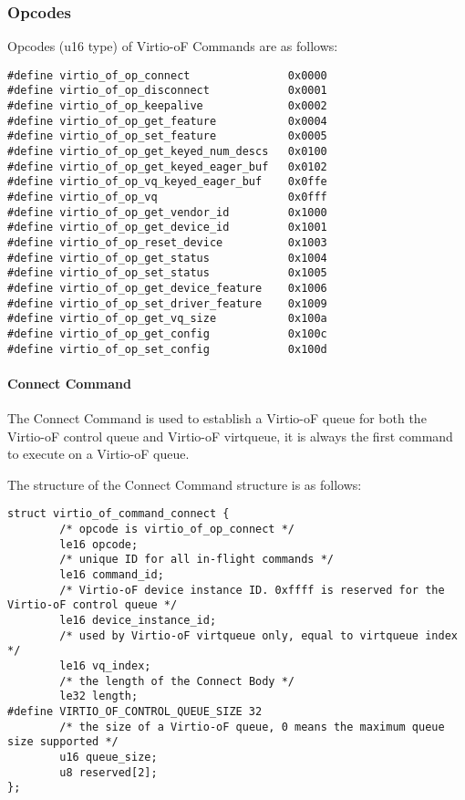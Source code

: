 \subsubsection{Opcodes}\label{sec:Virtio Transport Options / Virtio Over Fabrics / Commands Definition / Opcodes}
Opcodes (u16 type) of Virtio-oF Commands are as follows:

\begin{lstlisting}
#define virtio_of_op_connect               0x0000
#define virtio_of_op_disconnect            0x0001
#define virtio_of_op_keepalive             0x0002
#define virtio_of_op_get_feature           0x0004
#define virtio_of_op_set_feature           0x0005
#define virtio_of_op_get_keyed_num_descs   0x0100
#define virtio_of_op_get_keyed_eager_buf   0x0102
#define virtio_of_op_vq_keyed_eager_buf    0x0ffe
#define virtio_of_op_vq                    0x0fff
#define virtio_of_op_get_vendor_id         0x1000
#define virtio_of_op_get_device_id         0x1001
#define virtio_of_op_reset_device          0x1003
#define virtio_of_op_get_status            0x1004
#define virtio_of_op_set_status            0x1005
#define virtio_of_op_get_device_feature    0x1006
#define virtio_of_op_set_driver_feature    0x1009
#define virtio_of_op_get_vq_size           0x100a
#define virtio_of_op_get_config            0x100c
#define virtio_of_op_set_config            0x100d
\end{lstlisting}

\paragraph{Connect Command}\label{sec:Virtio Transport Options / Virtio Over Fabrics / Commands Definition / Opcodes / Connect Command}

The Connect Command is used to establish a Virtio-oF queue for both the Virtio-oF control queue and Virtio-oF virtqueue, it is always the first command to execute on a Virtio-oF queue.

The structure of the Connect Command structure is as follows:
\begin{lstlisting}
struct virtio_of_command_connect {
        /* opcode is virtio_of_op_connect */
        le16 opcode;
        /* unique ID for all in-flight commands */
        le16 command_id;
        /* Virtio-oF device instance ID. 0xffff is reserved for the Virtio-oF control queue */
        le16 device_instance_id;
        /* used by Virtio-oF virtqueue only, equal to virtqueue index */
        le16 vq_index;
        /* the length of the Connect Body */
        le32 length;
#define VIRTIO_OF_CONTROL_QUEUE_SIZE 32
        /* the size of a Virtio-oF queue, 0 means the maximum queue size supported */
        u16 queue_size;
        u8 reserved[2];
};
\end{lstlisting}

